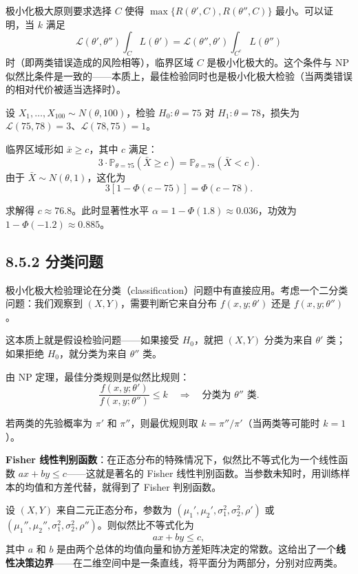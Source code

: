 极小化极大原则要求选择 $C$ 使得 $\max\{R(\theta', C), R(\theta'', C)\}$ 最小。可以证明，当 $k$ 满足
\[
\mathcal{L}(\theta', \theta'') \int_C L(\theta') = \mathcal{L}(\theta'', \theta') \int_{C^c} L(\theta'')
\]
时（即两类错误造成的风险相等），临界区域 $C$ 是极小化极大的。这个条件与 NP 似然比条件是一致的——本质上，最佳检验同时也是极小化极大检验（当两类错误的相对代价被适当选择时）。
\begin{example}[正态均值的极小化极大检验]\label{ex:minimax-normal}
设 $X_1, \ldots, X_{100} \sim N(\theta, 100)$，检验 $H_0: \theta = 75$ 对 $H_1: \theta = 78$，损失为 $\mathcal{L}(75, 78) = 3$、$\mathcal{L}(78, 75) = 1$。

临界区域形如 $\bar{x} \geq c$，其中 $c$ 满足：
\[
3 \cdot \mathbb{P}_{\theta=75}(\bar{X} \geq c) = \mathbb{P}_{\theta=78}(\bar{X} < c).
\]
由于 $\bar{X} \sim N(\theta, 1)$，这化为
\[
3[1 - \Phi(c-75)] = \Phi(c-78).
\]

求解得 $c \approx 76.8$。此时显著性水平 $\alpha = 1 - \Phi(1.8) \approx 0.036$，功效为 $1 - \Phi(-1.2) \approx 0.885$。\end{example}

\subsection{8.5.2 分类问题}

极小化极大检验理论在分类（classification）问题中有直接应用。考虑一个二分类问题：我们观察到 $(X, Y)$，需要判断它来自分布 $f(x,y;\theta')$ 还是 $f(x,y;\theta'')$。

这本质上就是假设检验问题——如果接受 $H_0$，就把 $(X,Y)$ 分类为来自 $\theta'$ 类；如果拒绝 $H_0$，就分类为来自 $\theta''$ 类。

由 NP 定理，最佳分类规则是似然比规则：
\[
\frac{f(x,y;\theta')}{f(x,y;\theta'')} \leq k \quad \Longrightarrow \quad \text{分类为 $\theta''$ 类}.
\]

若两类的先验概率为 $\pi'$ 和 $\pi''$，则最优规则取 $k = \pi''/\pi'$（当两类等可能时 $k=1$）。

\textbf{Fisher 线性判别函数}：在正态分布的特殊情况下，似然比不等式化为一个线性函数 $ax + by \leq c$——这就是著名的 Fisher 线性判别函数。当参数未知时，用训练样本的均值和方差代替，就得到了 Fisher 判别函数。
\begin{example}[二元正态的线性判别]\label{ex:bivariate-normal-classification}
设 $(X,Y)$ 来自二元正态分布，参数为 $(\mu_1', \mu_2', \sigma_1^2, \sigma_2^2, \rho')$ 或 $(\mu_1'', \mu_2'', \sigma_1^2, \sigma_2^2, \rho'')$。则似然比不等式化为
\[
ax + by \leq c,
\]
其中 $a$ 和 $b$ 是由两个总体的均值向量和协方差矩阵决定的常数。这给出了一个\textbf{线性决策边界}——在二维空间中是一条直线，将平面分为两部分，分别对应两类。\end{example}

